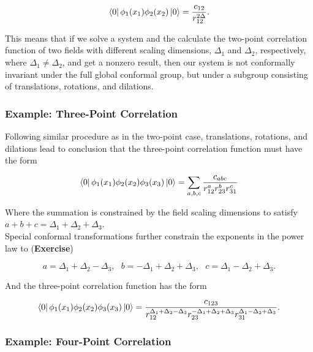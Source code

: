 \begin{equation}
\bra{0} \phi_1 (x_1) \phi_2 (x_2) \ket{0} = \frac{c_{12}}{r_{12}^{2\Delta}}.
\end{equation}

\noindent This means that if we solve a system and the calculate the two-point correlation function of two fields with different scaling dimensions, $\Delta_1$ and $\Delta_2$, respectively, where $\Delta_1 \ne \Delta_2$, and get a nonzero result, then our system is not conformally invariant under the full global conformal group, but under a subgroup consisting of translations, rotations, and dilations. \\

\subsubsection*{Example: Three-Point Correlation}

\noindent Following similar procedure as in the two-point case, translations, rotations, and dilations lead to conclusion that the three-point correlation function must have the form

\begin{equation}
\bra{0} \phi_1 (x_1) \phi_2 (x_2) \phi_3 (x_3) \ket{0} = \sum_{a,b,c} \frac{c_{abc}}{r_{12}^a r_{23}^b r_{31}^c}
\end{equation}

\noindent Where the summation is constrained by the field scaling dimensions to satisfy $a+b+c = \Delta_1 + \Delta_2 + \Delta_3$. \\

\noindent Special conformal transformations further constrain the exponents in the power law to (\textbf{Exercise})

\begin{equation}
a = \Delta_1 + \Delta_2 - \Delta_3, \,\,\,\, b = -\Delta_1 + \Delta_2 + \Delta_3, \,\,\,\, c = \Delta_1 - \Delta_2 + \Delta_3.
\end{equation}

\noindent And the three-point correlation function has the form

\begin{equation}
\bra{0} \phi_1 (x_1) \phi_2 (x_2) \phi_3 (x_3) \ket{0} = \frac{c_{123}}{r_{12}^{\Delta_1 + \Delta_2 - \Delta_3} r_{23}^{-\Delta_1 + \Delta_2 + \Delta_3} r_{31}^{\Delta_1 - \Delta_2 + \Delta_3}}.
\end{equation}

\subsubsection*{Example: Four-Point Correlation}

